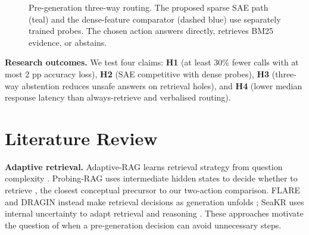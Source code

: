 \documentclass[11pt,a4paper,twocolumn]{article}
\begin{document}
\begin{figure}[!t]
\caption{Pre-generation three-way routing. The proposed sparse SAE path (teal) and the dense-feature comparator (dashed blue) use separately trained probes. The chosen action answers directly, retrieves BM25 evidence, or abstains.}
\label{fig:arch}
\end{figure}

\noindent\textbf{Research outcomes.} We test four claims: \textbf{H1} (at least 30\% fewer calls with at most 2 pp accuracy loss), \textbf{H2} (SAE competitive with dense probes), \textbf{H3} (three-way abstention reduces unsafe answers on retrieval holes), and \textbf{H4} (lower median response latency than always-retrieve and verbalised routing).

\section{Literature Review}
\textbf{Adaptive retrieval.} Adaptive-RAG learns retrieval strategy from question complexity \cite{jeong2024adaptive}. Probing-RAG uses intermediate hidden states to decide whether to retrieve \cite{baek2025probing}, the closest conceptual precursor to our two-action comparison. FLARE and DRAGIN instead make retrieval decisions as generation unfolds \cite{jiang2023flare,su2024dragin}; SeaKR uses internal uncertainty to adapt retrieval and reasoning \cite{yao2025seakr}. These approaches motivate the question of when a pre-generation decision can avoid unnecessary steps.
\end{document}
